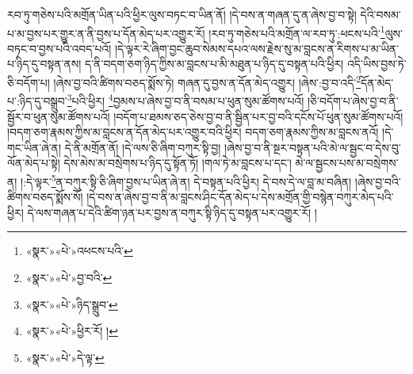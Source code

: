 རབ་ཏུ་གཅེས་པའི་མགྲོན་ཡིན་པའི་ཕྱིར་ལུས་བཏང་བ་ཡིན་ནོ། །དེ་བས་ན་གཞན་དུ་ན་ཞེས་བྱ་བ་སྟེ། དེའི་བསམ་པ་མ་བྱས་པར་གྱུར་ན་ནི་བྱས་པ་དོན་མེད་པར་འགྱུར་རོ། །རབ་ཏུ་གཅེས་པའི་མགྲོན་ལ་རབ་ཏུ་:ཕངས་པའི་\footnote{«སྣར་»«པེ་»འཕངས་པའི་}ལུས་བཏང་བ་བྱས་པའི་འབད་པའོ། །དེ་ལྟར་རེ་ཞིག་བྱང་ཆུབ་སེམས་དཔའ་ལས་རྗེས་སུ་མ་བླངས་ན་རིགས་པ་མ་ཡིན་པ་ཉིད་དུ་བསྟན་ནས། ད་ནི་བདག་ཅག་ཉིད་ཀྱིས་མ་བླངས་པ་མི་མཐུན་པ་ཉིད་དུ་བསྟན་པའི་ཕྱིར། འདི་ཡིས་བྱས་ཏེ་ཅི་བདོག་པ། །ཞེས་བྱ་བའི་ཚིགས་བཅད་སྨོས་ཏེ། གཞན་དུ་བྱས་ན་དོན་མེད་འགྱུར། །ཞེས་:བྱ་བ་འདི་\footnote{«སྣར་»«པེ་»བྱ་བའི་}དོན་མེད་པ་:ཉིད་དུ་བསྒྲུབ་\footnote{«སྣར་»«པེ་»ཉིད་སྒྲུབ་}པའི་ཕྱིར། \footnote{«སྣར་»«པེ་»ཕྱིར་རོ། ། }བྱམས་པ་ཞེས་བྱ་བ་ནི་བསམ་པ་ཕུན་སུམ་ཚོགས་པའོ། །ཅི་བདོག་པ་ཞེས་བྱ་བ་ནི་སྦྱོར་བ་ཕུན་སུམ་ཚོགས་པའོ། །བདོག་པ་ཐམས་ཅད་ཅེས་བྱ་བ་ནི་སྦྱིན་པར་བྱ་བའི་དངོས་པོ་ཕུན་སུམ་ཚོགས་པའོ། །བདག་ཅག་རྣམས་ཀྱིས་མ་བླངས་ན་དོན་མེད་པར་འགྱུར་བའི་ཕྱིར། བདག་ཅག་རྣམས་ཀྱིས་མ་བླངས་ནའོ། །དེ་གང་ཡིན་ཞེ་ན། དེ་ནི་མགྲོན་ནོ། །དེ་ལས་ཅི་ཞིག་བཀུར་སྟི་བྱ། །ཞེས་བྱ་བ་ནི་སྔར་བསྟན་པའི་མེ་ལ་སྦྱང་བ་དེས་བུ་ལོན་མེད་པ་སྟེ། དེས་མེས་མ་བསྲེགས་པ་ཉིད་དུ་སྟོན་ཏོ། །གལ་ཏེ་མ་བླངས་པ་དང་། མེ་ལ་སྦྱངས་པས་མ་བསྲེགས་ན། །:དེ་ལྟར་\footnote{«སྣར་»«པེ་»དེ་ལྟ་}ན་བཀུར་སྟི་ཅི་ཞིག་བྱས་པ་ཡིན་ཞེ་ན། དེ་བསྟན་པའི་ཕྱིར། དེ་བས་དེ་ལ་བླ་མ་བཞིན། །ཞེས་བྱ་བའི་ཚིགས་བཅད་སྨོས་སོ། །དེ་བས་ན་ཞེས་བྱ་བ་ནི་མ་བླངས་ཤིང་དོན་མེད་པ་དེས་མགྲོན་གྱི་བསྙེན་བཀུར་མེད་པའི་ཕྱིར། དེ་ལས་གཞན་པ་དེའི་ཚིག་ཉན་པར་བྱས་ན་བཀུར་སྟི་ཉིད་དུ་བསྟན་པར་འགྱུར་རོ། །
